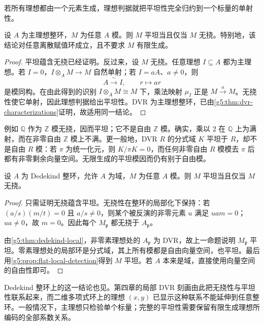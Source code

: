 若所有理想都由一个元素生成，理想判据就把平坦性完全归约到一个标量的单射性。

\begin{proposition}\label{g5:prop:torsion-free-pid-flat}
	设 \(A\) 为主理想整环，\(M\) 为任意 \(A\) 模。则 \(M\) 平坦当且仅当 \(M\) 无挠。特别地，该结论对任意离散赋值环成立，且不要求 \(M\) 有限生成。
\end{proposition}
\begin{proof}
	平坦蕴含无挠已经证明。反过来，设 \(M\) 无挠。任意理想 \(I\subseteq A\) 都为主理想。若 \(I=0\)，\(I\otimes_A M\to M\) 自然单射；若 \(I=aA\)、\(a\ne0\)，则
	\[
		A\xrightarrow{\ \sim\ }I,\qquad r\longmapsto ar
	\]
	是模同构。在由此得到的识别 \(I\otimes_A M\cong M\) 下，乘法映射 \(\mu_I\) 正是 \(M\xrightarrow{a}M\)。无挠性使它单射，因此理想判据给出平坦性。DVR 为主理想整环，已由\cref{g5:thm:dvr-characterizations}证明，故适用同一结论。
\end{proof}

例如 \(\mathbb Q\) 作为 \(\mathbb Z\) 模无挠，因而平坦；它不是自由 \(\mathbb Z\) 模。确实，乘以 \(2\) 在 \(\mathbb Q\) 上为满射，而在非零自由 \(\mathbb Z\) 模上不满。更一般地，DVR \(R\) 的分式域 \(K\) 平坦于 \(R\)，却不是自由 \(R\) 模：若 \(\pi\) 为统一化元，则 \(K/\pi K=0\)，而任何非零自由 \(R\) 模模去 \(\pi\) 后都有非零剩余向量空间。无限生成的平坦模因而仍有别于自由模。

\begin{corollary}\label{g5:cor:dedekind-torsion-free-flat}
	设 \(A\) 为 Dedekind 整环，允许 \(A\) 为域，\(M\) 为任意 \(A\) 模。则 \(M\) 平坦当且仅当 \(M\) 无挠。
\end{corollary}
\begin{proof}
	只需证明无挠蕴含平坦。无挠性在整环的局部化下保持：若
	\((a/s)(m/t)=0\) 且 \(a/s\ne0\)，则某个被反演的非零元素 \(u\) 满足 \(uam=0\)；\(ua\ne0\)，故 \(m=0\)。因此每个 \(M_{\mathfrak p}\) 都无挠于 \(A_{\mathfrak p}\)。

	由\cref{g5:thm:dedekind-local}，非零素理想处的 \(A_{\mathfrak p}\) 为 DVR，故上一命题说明 \(M_{\mathfrak p}\) 平坦。零素理想处的局部环是分式域，其上所有模都是自由向量空间，也平坦。最后用\cref{g5:prop:flat-local-detection}得到 \(M\) 平坦。若 \(A\) 本来是域，直接使用向量空间的自由性即可。
\end{proof}

Dedekind 整环上的这一结论也见\cite[第11节，习题11.8，第86页]{Matsumura1989}。第四章的局部 DVR 刻画由此把无挠性与平坦性联系起来，而二维多项式环上的理想 \((x,y)\) 已显示这种联系不能延伸到任意整环。一般情况下，主理想只检验单个标量；完整的平坦性需要保留有限生成理想所编码的全部系数关系。
